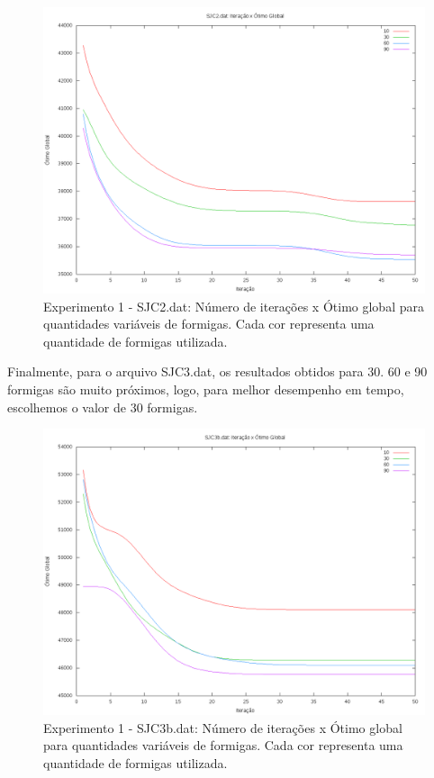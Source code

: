 \documentclass[12pt]{article}
\begin{document}
\begin{figure}[!htbp]
  \centering
  \includegraphics[width=1\textwidth]{exp1s2.png}
  \caption{Experimento 1 - SJC2.dat: Número de iterações x Ótimo global para quantidades variáveis
  de formigas. Cada cor representa uma quantidade de formigas utilizada.}
  \label{fig:exp1s2}
\end{figure}

Finalmente, para o arquivo SJC3.dat, os resultados obtidos para 30. 60 e 90 formigas são muito próximos,
logo, para melhor desempenho em tempo, escolhemos o valor de 30 formigas.

\begin{figure}[!htbp]
  \centering
  \includegraphics[width=1\textwidth]{exp1s3.png}
  \caption{Experimento 1 - SJC3b.dat: Número de iterações x Ótimo global para quantidades variáveis
  de formigas. Cada cor representa uma quantidade de formigas utilizada.}
  \label{fig:exp1s3}
\end{figure}
\end{document}

